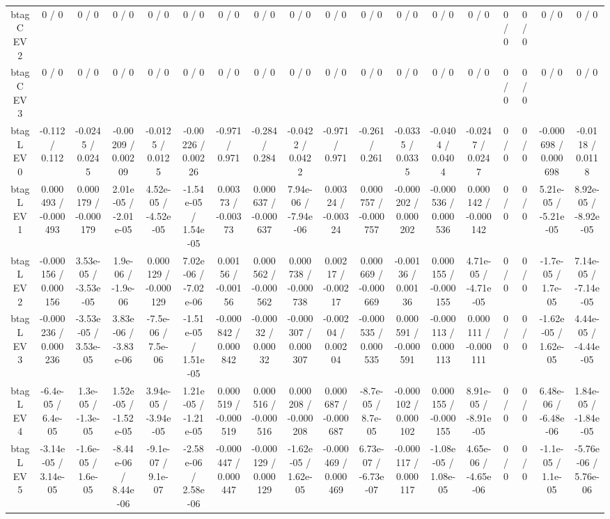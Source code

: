 \documentclass[10pt]{article}
\begin{document}
\begin{table}[htbp]
\begin{center}
\begin{tabular}{|c|c|c|c|c|c|c|c|c|c|c|c|c|c|c|c|c|c|}
  btag C EV 2 & 0 / 0 & 0 / 0 & 0 / 0 & 0 / 0 & 0 / 0 & 0 / 0 & 0 / 0 & 0 / 0 & 0 / 0 & 0 / 0 & 0 / 0 & 0 / 0 & 0 / 0 & 0 / 0 & 0 / 0 & 0 / 0 & 0 / 0 \\ 
  btag C EV 3 & 0 / 0 & 0 / 0 & 0 / 0 & 0 / 0 & 0 / 0 & 0 / 0 & 0 / 0 & 0 / 0 & 0 / 0 & 0 / 0 & 0 / 0 & 0 / 0 & 0 / 0 & 0 / 0 & 0 / 0 & 0 / 0 & 0 / 0 \\ 
  btag L EV 0 & -0.112 / 0.112 & -0.0245 / 0.0245 & -0.00209 / 0.00209 & -0.0125 / 0.0125 & -0.00226 / 0.00226 & -0.971 / 0.971 & -0.284 / 0.284 & -0.0422 / 0.0422 & -0.971 / 0.971 & -0.261 / 0.261 & -0.0335 / 0.0335 & -0.0404 / 0.0404 & -0.0247 / 0.0247 & 0 / 0 & 0 / 0 & -0.000698 / 0.000698 & -0.0118 / 0.0118 \\ 
  btag L EV 1 & 0.000493 / -0.000493 & 0.000179 / -0.000179 & 2.01e-05 / -2.01e-05 & 4.52e-05 / -4.52e-05 & -1.54e-05 / 1.54e-05 & 0.00373 / -0.00373 & 0.000637 / -0.000637 & 7.94e-06 / -7.94e-06 & 0.00324 / -0.00324 & 0.000757 / -0.000757 & -0.000202 / 0.000202 & -0.000536 / 0.000536 & 0.000142 / -0.000142 & 0 / 0 & 0 / 0 & 5.21e-05 / -5.21e-05 & 8.92e-05 / -8.92e-05 \\ 
  btag L EV 2 & -0.000156 / 0.000156 & 3.53e-05 / -3.53e-05 & 1.9e-06 / -1.9e-06 & 0.000129 / -0.000129 & 7.02e-06 / -7.02e-06 & 0.00156 / -0.00156 & 0.000562 / -0.000562 & 0.000738 / -0.000738 & 0.00217 / -0.00217 & 0.000669 / -0.000669 & -0.00136 / 0.00136 & 0.000155 / -0.000155 & 4.71e-05 / -4.71e-05 & 0 / 0 & 0 / 0 & -1.7e-05 / 1.7e-05 & 7.14e-05 / -7.14e-05 \\ 
  btag L EV 3 & -0.000236 / 0.000236 & -3.53e-05 / 3.53e-05 & 3.83e-06 / -3.83e-06 & -7.5e-06 / 7.5e-06 & -1.51e-05 / 1.51e-05 & -0.000842 / 0.000842 & -0.00032 / 0.00032 & -0.000307 / 0.000307 & -0.00204 / 0.00204 & -0.000535 / 0.000535 & 0.000591 / -0.000591 & -0.000113 / 0.000113 & 0.000111 / -0.000111 & 0 / 0 & 0 / 0 & -1.62e-05 / 1.62e-05 & 4.44e-05 / -4.44e-05 \\ 
  btag L EV 4 & -6.4e-05 / 6.4e-05 & 1.3e-05 / -1.3e-05 & 1.52e-05 / -1.52e-05 & 3.94e-05 / -3.94e-05 & 1.21e-05 / -1.21e-05 & 0.000519 / -0.000519 & 0.000516 / -0.000516 & 0.000208 / -0.000208 & 0.000687 / -0.000687 & -8.7e-05 / 8.7e-05 & -0.000102 / 0.000102 & 0.000155 / -0.000155 & 8.91e-05 / -8.91e-05 & 0 / 0 & 0 / 0 & 6.48e-06 / -6.48e-06 & 1.84e-05 / -1.84e-05 \\ 
  btag L EV 5 & -3.14e-05 / 3.14e-05 & -1.6e-05 / 1.6e-05 & -8.44e-06 / 8.44e-06 & -9.1e-07 / 9.1e-07 & -2.58e-06 / 2.58e-06 & -0.000447 / 0.000447 & -0.000129 / 0.000129 & -1.62e-05 / 1.62e-05 & -0.000469 / 0.000469 & 6.73e-07 / -6.73e-07 & -0.000117 / 0.000117 & -1.08e-05 / 1.08e-05 & 4.65e-06 / -4.65e-06 & 0 / 0 & 0 / 0 & -1.1e-05 / 1.1e-05 & -5.76e-06 / 5.76e-06 \\ 

\end{tabular}
\end{center}
\end{table}
\end{document}
